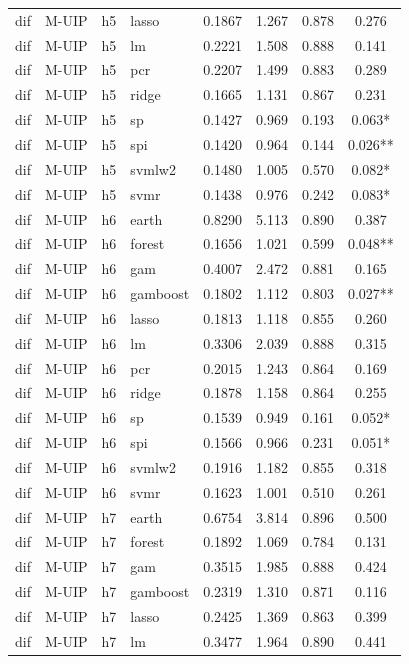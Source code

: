 \begin{ThreePartTable}
\begin{longtable}[t]{llclcccc}
dif & M-UIP & h5 & lasso & 0.1867 & 1.267 & 0.878 & 0.276\\
dif & M-UIP & h5 & lm & 0.2221 & 1.508 & 0.888 & 0.141\\
dif & M-UIP & h5 & pcr & 0.2207 & 1.499 & 0.883 & 0.289\\
dif & M-UIP & h5 & ridge & 0.1665 & 1.131 & 0.867 & 0.231\\
dif & M-UIP & h5 & sp & 0.1427 & 0.969 & 0.193 & 0.063*\\
dif & M-UIP & h5 & spi & 0.1420 & 0.964 & 0.144 & 0.026**\\
dif & M-UIP & h5 & svmlw2 & 0.1480 & 1.005 & 0.570 & 0.082*\\
dif & M-UIP & h5 & svmr & 0.1438 & 0.976 & 0.242 & 0.083*\\
\addlinespace
dif & M-UIP & h6 & earth & 0.8290 & 5.113 & 0.890 & 0.387\\
dif & M-UIP & h6 & forest & 0.1656 & 1.021 & 0.599 & 0.048**\\
dif & M-UIP & h6 & gam & 0.4007 & 2.472 & 0.881 & 0.165\\
dif & M-UIP & h6 & gamboost & 0.1802 & 1.112 & 0.803 & 0.027**\\
dif & M-UIP & h6 & lasso & 0.1813 & 1.118 & 0.855 & 0.260\\
dif & M-UIP & h6 & lm & 0.3306 & 2.039 & 0.888 & 0.315\\
dif & M-UIP & h6 & pcr & 0.2015 & 1.243 & 0.864 & 0.169\\
dif & M-UIP & h6 & ridge & 0.1878 & 1.158 & 0.864 & 0.255\\
dif & M-UIP & h6 & sp & 0.1539 & 0.949 & 0.161 & 0.052*\\
dif & M-UIP & h6 & spi & 0.1566 & 0.966 & 0.231 & 0.051*\\
dif & M-UIP & h6 & svmlw2 & 0.1916 & 1.182 & 0.855 & 0.318\\
dif & M-UIP & h6 & svmr & 0.1623 & 1.001 & 0.510 & 0.261\\
\addlinespace
dif & M-UIP & h7 & earth & 0.6754 & 3.814 & 0.896 & 0.500\\
dif & M-UIP & h7 & forest & 0.1892 & 1.069 & 0.784 & 0.131\\
dif & M-UIP & h7 & gam & 0.3515 & 1.985 & 0.888 & 0.424\\
dif & M-UIP & h7 & gamboost & 0.2319 & 1.310 & 0.871 & 0.116\\
dif & M-UIP & h7 & lasso & 0.2425 & 1.369 & 0.863 & 0.399\\
dif & M-UIP & h7 & lm & 0.3477 & 1.964 & 0.890 & 0.441\\

\end{longtable}
\end{ThreePartTable}

